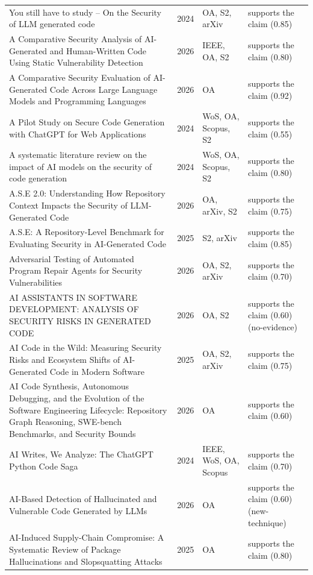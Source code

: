 \begin{longtable}{@{}%
  >{\raggedright\arraybackslash}p{}c%
  >{\raggedright\arraybackslash}p{}%
  >{\raggedright\arraybackslash}p{}@{}}
\textquotedbl{}You still have to study\textquotedbl{} -- On the Security of LLM generated code & 2024 & OA, S2, arXiv & supports the claim (0.85) \\
A Comparative Security Analysis of AI-Generated and Human-Written Code Using Static Vulnerability Detection & 2026 & IEEE, OA, S2 & supports the claim (0.80) \\
A Comparative Security Evaluation of AI-Generated Code Across Large Language Models and Programming Languages & 2026 & OA & supports the claim (0.92) \\
A Pilot Study on Secure Code Generation with ChatGPT for Web Applications & 2024 & WoS, OA, Scopus, S2 & supports the claim (0.55) \\
A systematic literature review on the impact of AI models on the security of code generation & 2024 & WoS, OA, Scopus, S2 & supports the claim (0.80) \\
A.S.E 2.0: Understanding How Repository Context Impacts the Security of LLM-Generated Code & 2026 & OA, arXiv, S2 & supports the claim (0.75) \\
A.S.E: A Repository-Level Benchmark for Evaluating Security in AI-Generated Code & 2025 & S2, arXiv & supports the claim (0.85) \\
Adversarial Testing of Automated Program Repair Agents for Security Vulnerabilities & 2026 & OA, S2, arXiv & supports the claim (0.70) \\
AI ASSISTANTS IN SOFTWARE DEVELOPMENT: ANALYSIS OF SECURITY RISKS IN GENERATED CODE & 2026 & OA, S2 & supports the claim (0.60) (no-evidence) \\
AI Code in the Wild: Measuring Security Risks and Ecosystem Shifts of AI-Generated Code in Modern Software & 2025 & OA, S2, arXiv & supports the claim (0.75) \\
AI Code Synthesis, Autonomous Debugging, and the Evolution of the Software Engineering Lifecycle: Repository Graph Reasoning, SWE-bench Benchmarks, and Security Bounds & 2026 & OA & supports the claim (0.60) \\
AI Writes, We Analyze: The ChatGPT Python Code Saga & 2024 & IEEE, WoS, OA, Scopus & supports the claim (0.70) \\
AI-Based Detection of Hallucinated and Vulnerable Code Generated by LLMs & 2026 & OA & supports the claim (0.60) (new-technique) \\
AI-Induced Supply-Chain Compromise: A Systematic Review of Package Hallucinations and Slopsquatting Attacks & 2025 & OA & supports the claim (0.80) \\

\end{longtable}
